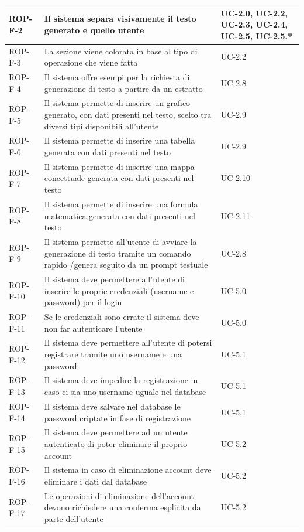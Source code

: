 \documentclass[11pt,a4paper]{article}
\begin{document}
\begin{longtable}{|p{}|>{\raggedright\arraybackslash}p{}|p{}|}
\hline
ROP-F-2 & Il sistema separa visivamente il testo generato e quello utente & UC-2.0, UC-2.2, UC-2.3, UC-2.4, UC-2.5, UC-2.5.* \\
\hline
ROP-F-3 & La sezione viene colorata in base al tipo di operazione che viene fatta & UC-2.2 \\
\hline
ROP-F-4 & Il sistema offre esempi per la richiesta di generazione di testo a partire da un estratto & UC-2.8 \\
\hline
ROP-F-5 & Il sistema permette di inserire un grafico generato, con dati presenti nel testo, scelto tra diversi tipi disponibili all'utente & UC-2.9 \\
\hline
ROP-F-6 & Il sistema permette di inserire una tabella generata con dati presenti nel testo & UC-2.9 \\
\hline
ROP-F-7 & Il sistema permette di inserire una mappa concettuale generata con dati presenti nel testo & UC-2.10 \\
\hline
ROP-F-8 & Il sistema permette di inserire una formula matematica generata con dati presenti nel testo & UC-2.11 \\
\hline
ROP-F-9 & Il sistema permette all'utente di avviare la generazione di testo tramite un comando rapido /genera seguito da un prompt testuale & UC-2.8 \\
\hline
ROP-F-10 & Il sistema deve permettere all'utente di inserire le proprie credenziali (username e password) per il login & UC-5.0 \\
\hline
ROP-F-11 & Se le credenziali sono errate il sistema deve non far autenticare l'utente & UC-5.0 \\
\hline
ROP-F-12 & Il sistema deve permettere all'utente di potersi registrare tramite uno username e una password & UC-5.1 \\
\hline
ROP-F-13 & Il sistema deve impedire la registrazione in caso ci sia uno username uguale nel database & UC-5.1 \\
\hline
ROP-F-14 & Il sistema deve salvare nel database le password criptate in fase di registrazione & UC-5.1 \\
\hline
ROP-F-15 & Il sistema deve permettere ad un utente autenticato di poter eliminare il proprio account & UC-5.2 \\
\hline
ROP-F-16 & Il sistema in caso di eliminazione account deve eliminare i dati dal database & UC-5.2 \\
\hline
ROP-F-17 & Le operazioni di eliminazione dell'account devono richiedere una conferma esplicita da parte dell'utente & UC-5.2 \\

\end{longtable}
\end{document}
